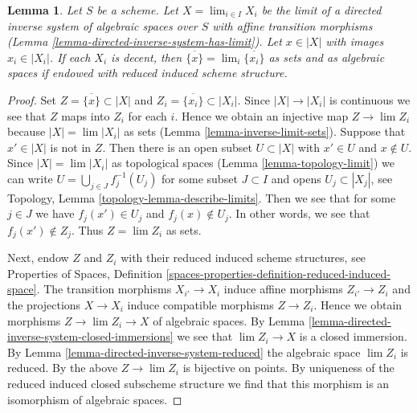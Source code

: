 \documentclass{stacks-project}
\theoremstyle{plain}
\newtheorem{lemma}[subsection]{Lemma}
\theoremstyle{definition}
\theoremstyle{remark}
\numberwithin{equation}{subsection}
\def\lim{\mathop{\mathrm{lim}}\nolimits}
\begin{document}
\begin{lemma}
\label{lemma-inverse-limit-irreducibles}
Let $S$ be a scheme. Let $X = \lim_{i \in I} X_i$ be the limit of a directed
inverse system of algebraic spaces over $S$ with affine transition morphisms
(Lemma \ref{lemma-directed-inverse-system-has-limit}).
Let $x \in |X|$ with images $x_i \in |X_i|$. If each $X_i$ is decent,
then $\overline{\{x\}} = \lim_i \overline{\{x_i\}}$ as sets
and as algebraic spaces if endowed with reduced induced scheme structure.
\end{lemma}

\begin{proof}
Set $Z = \overline{\{x\}} \subset |X|$ and
$Z_i = \overline{\{x_i\}} \subset |X_i|$.
Since $|X| \to |X_i|$ is continuous we see that $Z$ maps into $Z_i$
for each $i$. Hence we obtain an injective map $Z \to \lim Z_i$
because $|X| = \lim |X_i|$ as sets (Lemma \ref{lemma-inverse-limit-sets}).
Suppose that $x' \in |X|$ is not in $Z$.
Then there is an open subset $U \subset |X|$ with $x' \in U$
and $x \not \in U$. Since
$|X| = \lim |X_i|$ as topological spaces (Lemma \ref{lemma-topology-limit})
we can write $U = \bigcup_{j \in J} f_j^{-1}(U_j)$
for some subset $J \subset I$ and opens $U_j \subset |X_j|$, see
Topology, Lemma \ref{topology-lemma-describe-limits}.
Then we see that for some $j \in J$ we have $f_j(x') \in U_j$
and $f_j(x) \not \in U_j$. In other words, we see that $f_j(x') \not \in Z_j$.
Thus $Z = \lim Z_i$ as sets.

\medskip\noindent
Next, endow $Z$ and $Z_i$ with their reduced induced scheme structures, see
Properties of Spaces, Definition
\ref{spaces-properties-definition-reduced-induced-space}.
The transition morphisms $X_{i'} \to X_i$ induce affine
morphisms $Z_{i'} \to Z_i$ and the projections $X \to X_i$
induce compatible morphisms $Z \to Z_i$.
Hence we obtain morphisms $Z \to \lim Z_i \to X$ of algebraic spaces.
By Lemma \ref{lemma-directed-inverse-system-closed-immersions}
we see that $\lim Z_i \to X$ is a
closed immersion. By Lemma \ref{lemma-directed-inverse-system-reduced}
the algebraic space $\lim Z_i$ is reduced.
By the above $Z \to \lim Z_i$ is bijective on points.
By uniqueness of the reduced induced closed subscheme structure
we find that this morphism is an isomorphism of algebraic spaces.
\end{proof}
\end{document}
